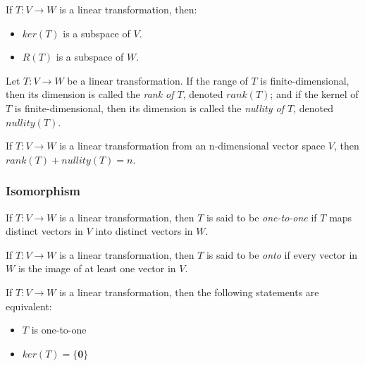 \documentclass{report}
\begin{document}
		\begin{thm}
			If $T:V \rightarrow W$ is a linear transformation, then:
			\begin{itemize}
				\item $ker(T)$ is a subspace of $V$.
				\item $R(T)$ is a subspace of $W$.
			\end{itemize}
		\end{thm}
		
		\begin{defn}
			Let  $T:V \rightarrow W$ be a linear transformation. If the range of $T$ is finite-dimensional, then its dimension is called the \emph{rank of $T$}, denoted $rank(T)$; and if the kernel of $T$ is finite-dimensional, then its dimension is called the \emph{nullity of $T$}, denoted $nullity(T)$.
		\end{defn}
		
		\begin{thm}
			If $T:V \rightarrow W$ is a linear transformation from an n-dimensional vector space $V$, then $rank(T)+nullity(T)=n$.
		\end{thm}
		
		\subsubsection{Isomorphism}
		\begin{defn}
			If $T:V \rightarrow W$ is a linear transformation, then $T$ is said to be \emph{one-to-one} if $T$ maps distinct vectors in $V$ into distinct vectors in $W$.
		\end{defn}
		
		\begin{defn}[Onto]
			If $T:V \rightarrow W$ is a linear transformation, then $T$ is said to be \emph{onto} if every vector in $W$ is the image of at least one vector in $V$.
		\end{defn}
		
		\begin{thm}
			If $T:V \rightarrow W$ is a linear transformation, then the following statements are equivalent:
			\begin{itemize}
				\item $T$ is one-to-one
				\item $ker(T)=\{\bm{0}\}$
			\end{itemize}
		\end{thm}
		
\end{document}

